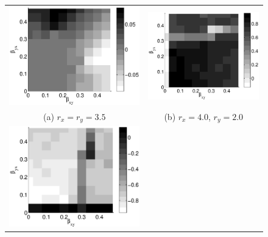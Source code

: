 \documentclass[twocolumn,aps,pre,groupedaddress]{revtex4-1}
\begin{document}
\begin{figure}[ht]
\begin{tabular}{cc}
\includegraphics[scale=0.30]{CoupLogexample_rx35ry35.eps} &
\includegraphics[scale=0.30]{CoupLogexample_rx40ry20.eps} \\
(a) $r_x = r_y = 3.5$ & (b) $r_x = 4.0$, $r_y = 2.0$ \\
\includegraphics[scale=0.30]{CoupLogexample_rx20ry40.eps} &

\end{tabular}
\end{figure}
\end{document}
